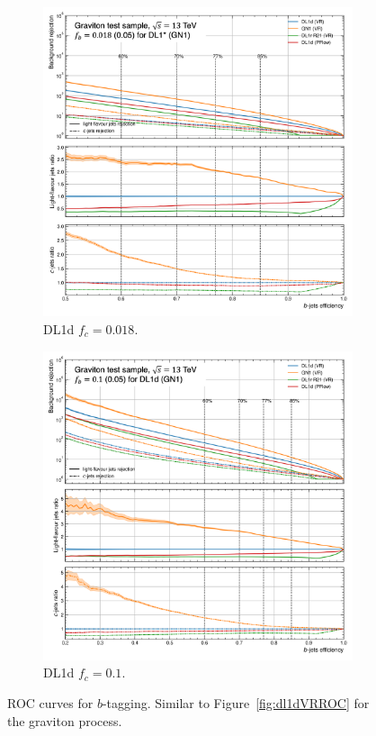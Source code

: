 \begin{figure}[h!]
  \centering
  \begin{subfigure}[t]{0.48\textwidth}
    \centering
    \includegraphics[width=\textwidth]{Images/FTAG/VRDL1d/ROC/grb.png}
    \caption{DL1d $f_c = 0.018$.}
    \label{fig:dl1dVRROCgr}
  \end{subfigure}
  \begin{subfigure}[t]{0.48\textwidth}
    \centering
    \includegraphics[width=\textwidth]{Images/FTAG/VRDL1d/ROC/grbupf.png}
    \caption{DL1d $f_c = 0.1$.}
    \label{fig:dl1dVRROCgrc}
  \end{subfigure}
  \caption{ROC curves for $b$-tagging. Similar to Figure~\ref{fig:dl1dVRROC} for the graviton process.}
  \label{fig:dl1dVRROCgrav}
\end{figure}

